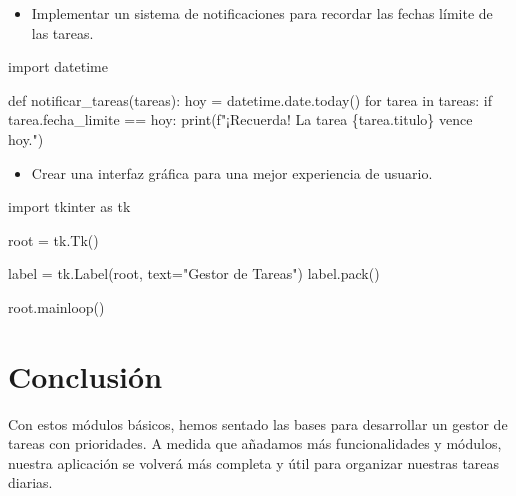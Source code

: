 \documentclass[
  a4paper,
  DIV=11,
  numbers=noendperiod,
  onepage,
  openany]{scrreprt}
\newenvironment{Shaded}{\begin{snugshade}}{\end{snugshade}}
\newcommand{\BuiltInTok}[1]{\textcolor[rgb]{0.00,0.23,0.31}{#1}}
\newcommand{\ControlFlowTok}[1]{\textcolor[rgb]{0.00,0.23,0.31}{#1}}
\newcommand{\ImportTok}[1]{\textcolor[rgb]{0.00,0.46,0.62}{#1}}
\newcommand{\KeywordTok}[1]{\textcolor[rgb]{0.00,0.23,0.31}{#1}}
\newcommand{\NormalTok}[1]{\textcolor[rgb]{0.00,0.23,0.31}{#1}}
\newcommand{\OperatorTok}[1]{\textcolor[rgb]{0.37,0.37,0.37}{#1}}
\newcommand{\SpecialCharTok}[1]{\textcolor[rgb]{0.37,0.37,0.37}{#1}}
\newcommand{\SpecialStringTok}[1]{\textcolor[rgb]{0.13,0.47,0.30}{#1}}
\newcommand{\StringTok}[1]{\textcolor[rgb]{0.13,0.47,0.30}{#1}}
\providecommand{\tightlist}{%
  \setlength{\itemsep}{0pt}\setlength{\parskip}{0pt}}\usepackage{longtable,booktabs,array}
\begin{document}
\begin{itemize}
\tightlist
\item
  Implementar un sistema de notificaciones para recordar las fechas
  límite de las tareas.
\end{itemize}

\begin{Shaded}
\begin{Highlighting}[]
\ImportTok{import}\NormalTok{ datetime}

\KeywordTok{def}\NormalTok{ notificar\_tareas(tareas):}
\NormalTok{    hoy }\OperatorTok{=}\NormalTok{ datetime.date.today()}
    \ControlFlowTok{for}\NormalTok{ tarea }\KeywordTok{in}\NormalTok{ tareas:}
        \ControlFlowTok{if}\NormalTok{ tarea.fecha\_limite }\OperatorTok{==}\NormalTok{ hoy:}
            \BuiltInTok{print}\NormalTok{(}\SpecialStringTok{f"¡Recuerda! La tarea \textquotesingle{}}\SpecialCharTok{\{}\NormalTok{tarea}\SpecialCharTok{.}\NormalTok{titulo}\SpecialCharTok{\}}\SpecialStringTok{\textquotesingle{} vence hoy."}\NormalTok{)}
\end{Highlighting}
\end{Shaded}

\begin{itemize}
\tightlist
\item
  Crear una interfaz gráfica para una mejor experiencia de usuario.
\end{itemize}

\begin{Shaded}
\begin{Highlighting}[]
\ImportTok{import}\NormalTok{ tkinter }\ImportTok{as}\NormalTok{ tk}

\NormalTok{root }\OperatorTok{=}\NormalTok{ tk.Tk()}

\NormalTok{label }\OperatorTok{=}\NormalTok{ tk.Label(root, text}\OperatorTok{=}\StringTok{"Gestor de Tareas"}\NormalTok{)}
\NormalTok{label.pack()}

\NormalTok{root.mainloop()}
\end{Highlighting}
\end{Shaded}

\chapter{Conclusión}\label{conclusiuxf3n-3}

Con estos módulos básicos, hemos sentado las bases para desarrollar un
gestor de tareas con prioridades. A medida que añadamos más
funcionalidades y módulos, nuestra aplicación se volverá más completa y
útil para organizar nuestras tareas diarias.
\end{document}
